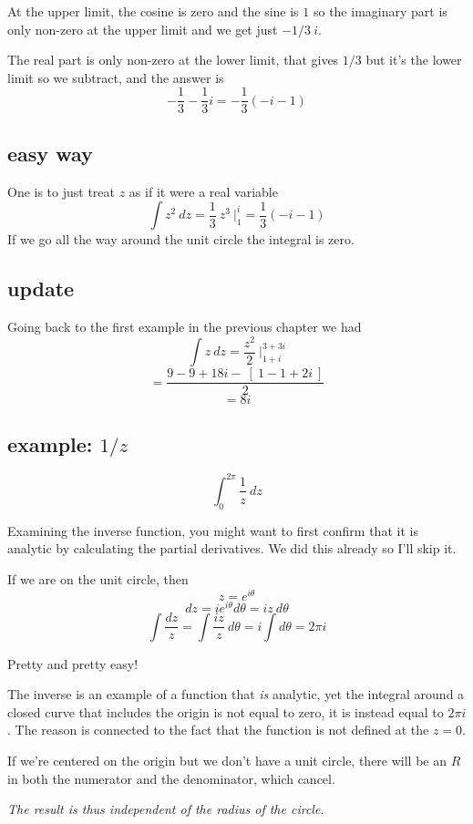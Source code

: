 \documentclass[11pt, oneside]{article}
\begin{document}
At the upper limit, the cosine is zero and the sine is $1$ so the imaginary part is only non-zero at the upper limit and we get just $-1/3 \ i$.  

The real part is only non-zero at the lower limit, that gives $1/3$ but it's the lower limit so we subtract, and the answer is
\[ -\frac{1}{3} - \frac{1}{3} i = -\frac{1}{3} (-i - 1) \]

\subsection*{easy way}
One is to just treat $z$ as if it were a real variable
\[ \int z^2 \ dz = \frac{1}{3} \ z^3 \ \bigg |_1^i = \frac{1}{3} (-i - 1) \]
If we go all the way around the unit circle the integral is zero.

\subsection*{update}

Going back to the first example in the previous chapter we had
\[ \int z \ dz = \frac{z^2}{2} \ \bigg |_{1 + i}^{3 + 3i} \]
\[ = \frac{9 - 9 + 18i - \ [ \ 1 - 1 + 2i \ ] }{2} \]
\[ = 8i \]

\subsection*{example:  $1/z$}
\[ \int_0^{2\pi} \frac{1}{z} \ dz \]

Examining the inverse function, you might want to first confirm that it is analytic by calculating the partial derivatives.  We did this already so I'll skip it.

If we are on the unit circle, then 
\[ z = e^{i\theta} \]
\[ dz = ie^{i\theta} d \theta = iz\ d \theta \]
\[ \int \frac{dz}{z} = \int \frac{iz}{z} \ d \theta = i \int d \theta = 2 \pi i \]

Pretty and pretty easy!

The inverse is an example of a function that \emph{is} analytic, yet the integral around a closed curve that includes the origin is not equal to zero, it is instead equal to $2 \pi i$.  The reason is connected to the fact that the function is not defined at the $z=0$.

If we're centered on the origin but we don't have a unit circle, there will be an $R$ in both the numerator and the denominator, which cancel.

\emph{The result is thus independent of the radius of the circle.}
\end{document}
